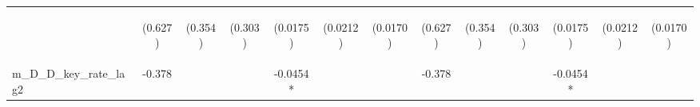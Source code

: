 \documentclass[]{article}
\begin{document}
\begin{center}
\begin{tabular}{lcccccccccccc}
\vspace{4pt} & \begin{footnotesize}(0.627)\end{footnotesize} & \begin{footnotesize}(0.354)\end{footnotesize} & \begin{footnotesize}(0.303)\end{footnotesize} & \begin{footnotesize}(0.0175)\end{footnotesize} & \begin{footnotesize}(0.0212)\end{footnotesize} & \begin{footnotesize}(0.0170)\end{footnotesize} & \begin{footnotesize}(0.627)\end{footnotesize} & \begin{footnotesize}(0.354)\end{footnotesize} & \begin{footnotesize}(0.303)\end{footnotesize} & \begin{footnotesize}(0.0175)\end{footnotesize} & \begin{footnotesize}(0.0212)\end{footnotesize} & \begin{footnotesize}(0.0170)\end{footnotesize} \\
m\_D\_D\_key\_rate\_lag2 & -0.378 &  &  & -0.0454* &  &  & -0.378 &  &  & -0.0454* &  &  \\

\end{tabular}
\end{center}
\end{document}
